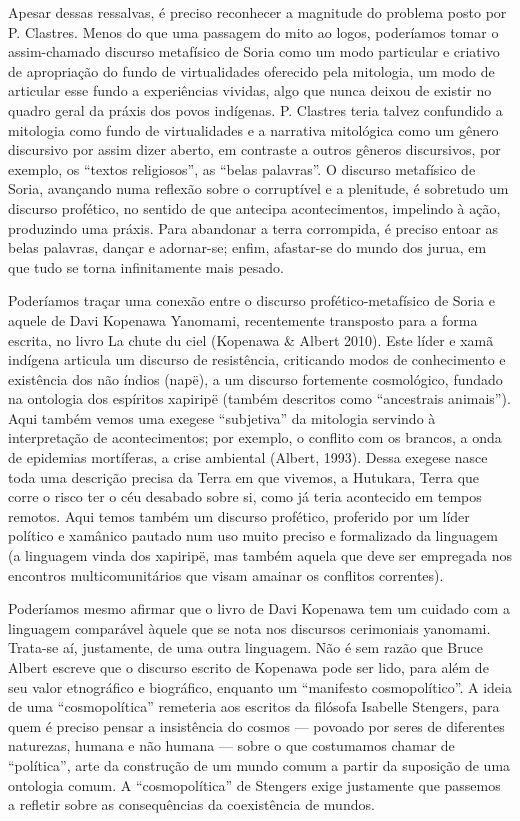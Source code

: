 Apesar dessas ressalvas, é preciso reconhecer a magnitude do problema
posto por P. Clastres. Menos do que uma passagem do mito ao logos,
poderíamos tomar o assim-chamado discurso metafísico de Soria como um
modo particular e criativo de apropriação do fundo de virtualidades
oferecido pela mitologia, um modo de articular esse fundo a
experiências vividas, algo que nunca deixou de existir no quadro geral
da práxis dos povos indígenas. P. Clastres teria talvez confundido a
mitologia como fundo de virtualidades e a narrativa mitológica como um
gênero discursivo por assim dizer aberto, em contraste a outros gêneros
discursivos, por exemplo, os ``textos religiosos'', as ``belas palavras''.
O discurso metafísico de Soria, avançando numa reflexão sobre o
corruptível e a plenitude, é sobretudo um discurso profético, no
sentido de que antecipa acontecimentos, impelindo à ação, produzindo
uma práxis. Para abandonar a terra corrompida, é preciso entoar as
belas palavras, dançar e adornar-se; enfim, afastar-se do mundo dos
jurua, em que tudo se torna infinitamente mais pesado. 

Poderíamos traçar uma conexão entre o discurso profético-metafísico de
Soria e aquele de Davi Kopenawa Yanomami, recentemente transposto para
a forma escrita, no livro La chute du ciel (Kopenawa \& Albert 2010).
Este líder e xamã indígena articula um discurso de resistência,
criticando modos de conhecimento e existência dos não índios (napë), a
um discurso fortemente cosmológico, fundado na ontologia dos espíritos
xapiripë (também descritos como ``ancestrais animais''). Aqui também
vemos uma exegese ``subjetiva'' da mitologia servindo à interpretação de
acontecimentos; por exemplo, o conflito com os brancos, a onda de
epidemias mortíferas, a crise ambiental (Albert, 1993). Dessa exegese
nasce toda uma descrição precisa da Terra em que vivemos, a Hutukara,
Terra que corre o risco ter o céu desabado sobre si, como já teria
acontecido em tempos remotos. Aqui temos também um discurso profético,
proferido por um líder político e xamânico pautado num uso muito
preciso e formalizado da linguagem (a linguagem vinda dos xapiripë, mas
também aquela que deve ser empregada nos encontros multicomunitários
que visam amainar os conflitos correntes). 

Poderíamos mesmo afirmar que o livro de Davi Kopenawa tem um cuidado com
a linguagem comparável àquele que se nota nos discursos cerimoniais
yanomami. Trata-se aí, justamente, de uma outra linguagem. Não é sem
razão que Bruce Albert escreve que o discurso escrito de Kopenawa pode
ser lido, para além de seu valor etnográfico e biográfico, enquanto um
``manifesto cosmopolítico''. A ideia de uma ``cosmopolítica'' remeteria aos
escritos da filósofa Isabelle Stengers, para quem é preciso pensar a
insistência do cosmos --- povoado por seres de diferentes naturezas,
humana e não humana --- sobre o que costumamos chamar de ``política'', arte
da construção de um mundo comum a partir da suposição de uma ontologia
comum. A ``cosmopolítica'' de Stengers exige justamente que passemos a
refletir sobre as consequências da coexistência de mundos.

